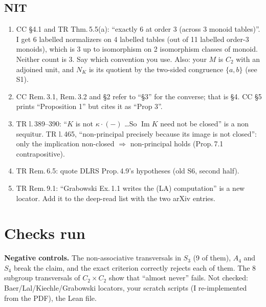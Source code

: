 \documentclass[11pt]{article}
\renewcommand{\Im}{\operatorname{Im}}
\begin{document}
\subsection*{NIT}
\begin{enumerate}[label=\textbf{N\arabic*.},leftmargin=*]
\item CC \S4.1 and TR Thm.\,5.5(a): ``exactly 6 at order 3 (across 3 monoid tables)''. I get 6
  labelled normalizers on 4 labelled tables (out of 11 labelled order-3 monoids), which is 3 up to
  isomorphism on 2 isomorphism classes of monoid. Neither count is 3. Say which convention you use. Also: your $M$ is
  $C_2$ with an adjoined unit, and $N_K$ is its quotient by the two-sided congruence $\{a,b\}$ (see S1).
\item CC Rem.\,3.1, Rem.\,3.2 and \S2 refer to ``\S3'' for the converse; that is \S4. CC \S5 prints
  ``Proposition 1'' but cites it as ``Prop 3''.
\item TR l.\,389--390: ``$K$ is not $\kappa\cdot(-)$ \dots So $\Im K$ need not be closed'' is a non
  sequitur. TR l.\,465, ``non-principal precisely because its image is not closed'': only the
  implication non-closed $\Rightarrow$ non-principal holds (Prop.\,7.1 contrapositive).
\item TR Rem.\,6.5: quote DLRS Prop.\,4.9's hypotheses (old S6, second half).
\item TR Rem.\,9.1: ``Grabowski Ex.\,1.1 writes the (LA) computation'' is a new locator. Add it to the
  deep-read list with the two arXiv entries.
\end{enumerate}

\section*{Checks run}
{\small
{}}

\textbf{Negative controls.} The non-associative transversals in $S_3$ (9 of them), $A_4$ and $S_4$ break the
claim, and the exact criterion correctly rejects each of them. The 8 subgroup transversals of
$C_2\times C_2$ show that ``almost never'' fails. Not checked: Baer/Lal/Kiechle/Grabowski locators,
your scratch scripts (I re-implemented from the PDF), the Lean file.
\end{document}
